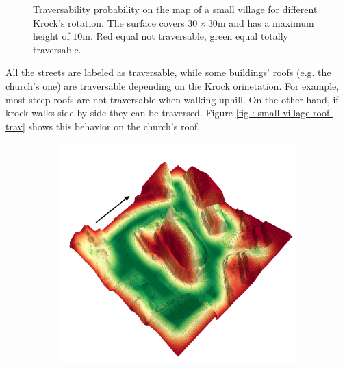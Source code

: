 \documentclass[../document.tex]{subfiles}
\begin{document}
\begin{figure} [htbp]
\begin{subfigure}[b]{0.45\textwidth}
  \end{subfigure}
  \caption{Traversability probability on the map of a small village for different Krock's rotation. The surface covers $30\times 30$m and has a maximum height of $10$m. Red equal not traversable, green equal totally traversable. }
  \label{fig : small-village-trav}
  \end{figure}
  All the streets are labeled as traversable, while some buildings' roofs (e.g. the church's one) are traversable depending on the Krock orinetation. For example, most steep roofs are not traversable when walking uphill. On the other hand, if krock walks side by side they can be traversed. Figure \ref{fig : small-village-roof-trav} shows this behavior on the church's roof.
  \begin{figure} [htbp]
    \centering
    \begin{subfigure}[b]{0.45\textwidth}
      \includegraphics[width=\linewidth]{../img/4/traversability/sullens-church/-270.png} 
    \end{subfigure}
    \begin{subfigure}[b]{0.45\textwidth}

\end{subfigure}
\end{figure}
\end{document}
